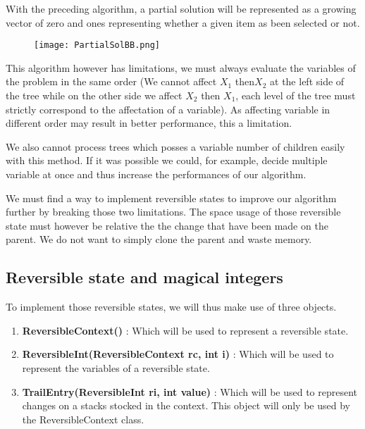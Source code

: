 With the preceding algorithm, a partial solution will be represented as a growing vector
of zero and ones representing whether a given item as been selected or not.

\begin{figure}[!ht]
    \centering
    \texttt{[image: PartialSolBB.png]}
    \label{fig:Knapsack_example}
\end{figure}
\FloatBarrier

This algorithm however has limitations, we must always evaluate the variables of the 
problem in the same order (We cannot affect $X_1$ then$ X_2$ at the left side of the tree 
while on the other side we affect $X_2$ then $X_1$, each level of the tree must strictly 
correspond to the affectation of a variable). As affecting variable in different order may result in better performance, this a limitation.\newline

We also cannot process trees which posses a variable number of children easily with this method. If it was possible we could, for example, decide multiple variable at once
and thus increase the performances of our algorithm. \newline

We must find a way to implement reversible states to improve our algorithm further
by breaking those two limitations. The space usage of those reversible state must however
be relative the the change that have been made on the parent. We do not want to simply
clone the parent and waste memory.

\subsection{Reversible state and magical integers}

To implement those reversible states, we will thus make use of three objects.

\begin{enumerate}
	\item \textbf{ReversibleContext()} : Which will be used to represent a 
	reversible state.
	\item \textbf{ReversibleInt(ReversibleContext rc, int i)} : Which will be used to 
	represent the variables of a reversible state.
	\item \textbf{TrailEntry(ReversibleInt ri, int value)} : Which will be used
	to represent changes on a stacks stocked in the context. This object will
	only be used by the ReversibleContext class.
\end{enumerate}

